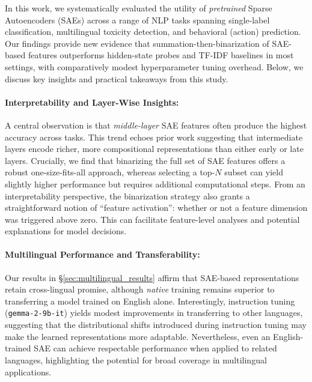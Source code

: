 In this work, we systematically evaluated the utility of \emph{pretrained} Sparse Autoencoders (SAEs) across a range of NLP tasks spanning single-label classification, multilingual toxicity detection, and behavioral (action) prediction. Our findings provide new evidence that summation-then-binarization of SAE-based features outperforms hidden-state probes and TF-IDF baselines in most settings, with comparatively modest hyperparameter tuning overhead. Below, we discuss key insights and practical takeaways from this study.

\paragraph{Interpretability and Layer-Wise Insights:}
A central observation is that \emph{middle-layer} SAE features often produce the highest accuracy across tasks. This trend echoes prior work suggesting that intermediate layers encode richer, more compositional representations than either early or late layers. Crucially, we find that binarizing the full set of SAE features offers a robust one-size-fits-all approach, whereas selecting a top-$N$ subset can yield slightly higher performance but requires additional computational steps. From an interpretability perspective, the binarization strategy also grants a straightforward notion of “feature activation”: whether or not a feature dimension was triggered above zero. This can facilitate feature-level analyses and potential explanations for model decisions.

\paragraph{Multilingual Performance and Transferability:}
Our results in \S\ref{sec:multilingual_results} affirm that SAE-based representations retain cross-lingual promise, although \emph{native} training remains superior to transferring a model trained on English alone. Interestingly, instruction tuning (\texttt{gemma-2-9b-it}) yields modest improvements in transferring to other languages, suggesting that the distributional shifts introduced during instruction tuning may make the learned representations more adaptable. Nevertheless, even an English-trained SAE can achieve respectable performance when applied to related languages, highlighting the potential for broad coverage in multilingual applications.

